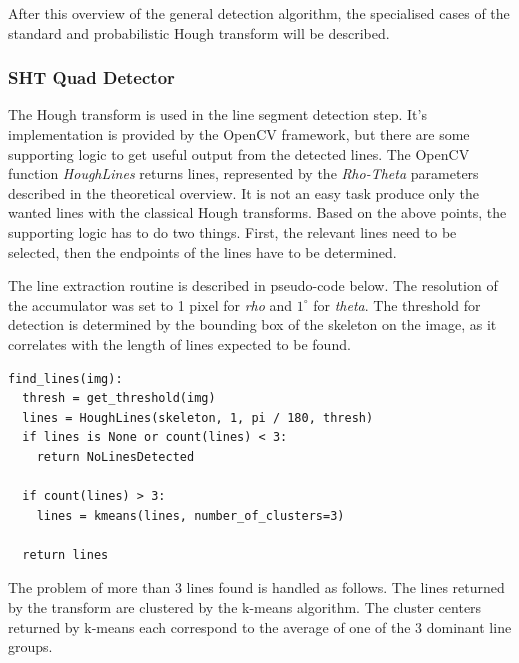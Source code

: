 After this overview of the general detection algorithm, the specialised cases of the standard and probabilistic Hough transform will be described.

\subsubsection{SHT Quad Detector}

The Hough transform is used in the line segment detection step.
It's implementation is provided by the OpenCV framework, but there are some supporting logic to get useful output from the detected lines.
The OpenCV function \textit{HoughLines} returns lines, represented by the \textit{Rho-Theta} parameters described in the theoretical overview.
It is not an easy task produce only the wanted lines with the classical Hough transforms.
Based on the above points, the supporting logic has to do two things.
First, the relevant lines need to be selected, then the endpoints of the lines have to be determined.

The line extraction routine is described in pseudo-code below.
The resolution of the accumulator was set to 1 pixel for \textit{rho} and $1^\circ$ for \textit{theta}.
The threshold for detection is determined by the bounding box of the skeleton on the image, as it correlates with the length of lines expected to be found.
\begin{lstlisting}
find_lines(img):
  thresh = get_threshold(img)
  lines = HoughLines(skeleton, 1, pi / 180, thresh)
  if lines is None or count(lines) < 3:
    return NoLinesDetected

  if count(lines) > 3:
    lines = kmeans(lines, number_of_clusters=3)
	
  return lines
\end{lstlisting}
The problem of more than 3 lines found is handled as follows.
The lines returned by the transform are clustered by the k-means algorithm.
The cluster centers returned by k-means each correspond to the average of one of the 3 dominant line groups.

